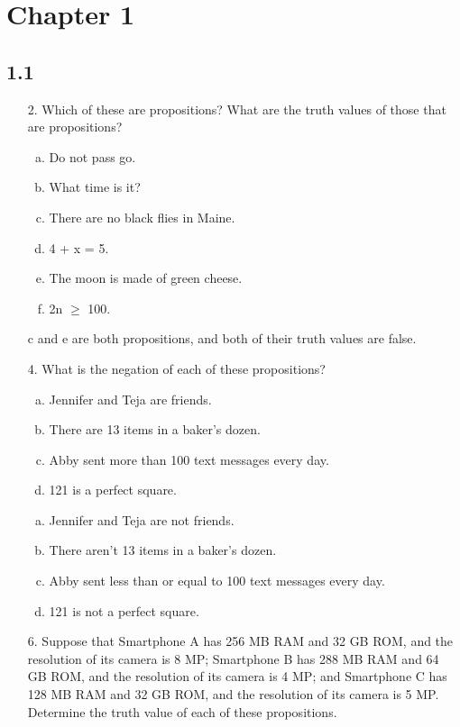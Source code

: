 \section{Chapter 1}
\subsection{1.1}
\begin{itemize}
\item[2.]Which of these are propositions? What are the truth values of those that are propositions?
\begin {enumerate}[a.]
\item Do not pass go.
\item What time is it?
\item There are no black flies in Maine.
\item 4 + x = 5.
\item The moon is made of green cheese.
\item 2n $\geq$ 100.
\end{enumerate}
\answer c and e are both propositions, and both of their truth values are false.
\item[4.]What is the negation of each of these propositions?
\begin{enumerate}[a.]
    \item Jennifer and Teja are friends.
    \item There are 13 items in a baker’s dozen.
    \item Abby sent more than 100 text messages every day.
    \item 121 is a perfect square.
\end{enumerate}
\answer
\begin{enumerate}[a.]
    \item Jennifer and Teja are not friends.
    \item There aren’t 13 items in a baker’s dozen.
    \item Abby sent less than or equal to 100 text messages every day.
    \item 121 is not a perfect square.
\end{enumerate}
\item[6.]Suppose that Smartphone A has 256 MB RAM and 32 GB ROM, and the resolution of its camera is 8 MP; Smartphone B has 288 MB RAM and 64 GB ROM, and the resolution of its camera is 4 MP; and Smartphone C has 128 MB RAM and 32 GB ROM, and the resolution of
its camera is 5 MP. Determine the truth value of each of these propositions.
\begin{enumerate}[a.]

\end{enumerate}
\end{itemize}
